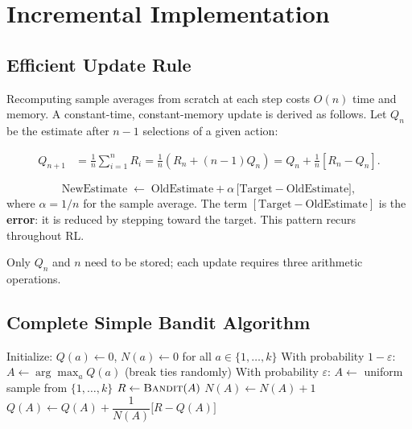 \documentclass[11pt,a4paper]{article}
\theoremstyle{definition}
\theoremstyle{plain}
\theoremstyle{remark}
\begin{document}
\section{Incremental Implementation}

\subsection{Efficient Update Rule}

Recomputing sample averages from scratch at each step costs $O(n)$ time and memory. A constant-time, constant-memory update is derived as follows. Let $Q_n$ be the estimate after $n-1$ selections of a given action:

\begin{align*}
    Q_{n+1} &= \frac{1}{n}\sum_{i=1}^{n} R_i
    = \frac{1}{n}\!\left(R_n + (n-1)Q_n\right)
    = Q_n + \frac{1}{n}\!\left[R_n - Q_n\right].
\end{align*}

\begin{tcolorbox}[colback=blue!5!white,colframe=blue!75!black,title=\textbf{Incremental Update (General Form)}]
\[
    \text{NewEstimate} \;\leftarrow\; \text{OldEstimate} + \alpha\,\bigl[\text{Target} - \text{OldEstimate}\bigr],
\]
where $\alpha = 1/n$ for the sample average. The term $[\text{Target} - \text{OldEstimate}]$ is the \textbf{error}: it is reduced by stepping toward the target. This pattern recurs throughout RL.
\end{tcolorbox}

Only $Q_n$ and $n$ need to be stored; each update requires three arithmetic operations.

\subsection{Complete Simple Bandit Algorithm}

\begin{algorithm}
\caption{Simple Bandit ($\varepsilon$-greedy, sample average)}
\begin{algorithmic}
\STATE Initialize: $Q(a) \leftarrow 0$, $N(a) \leftarrow 0$ for all $a \in \{1, \ldots, k\}$
\LOOP
    \STATE With probability $1-\varepsilon$: $A \leftarrow \arg\max_a Q(a)$ (break ties randomly)
    \STATE With probability $\varepsilon$: $A \leftarrow$ uniform sample from $\{1,\ldots,k\}$
    \STATE $R \leftarrow \textsc{Bandit}(A)$
    \STATE $N(A) \leftarrow N(A) + 1$
    \STATE $Q(A) \leftarrow Q(A) + \dfrac{1}{N(A)}\bigl[R - Q(A)\bigr]$
\ENDLOOP
\end{algorithmic}
\end{algorithm}
\end{document}
